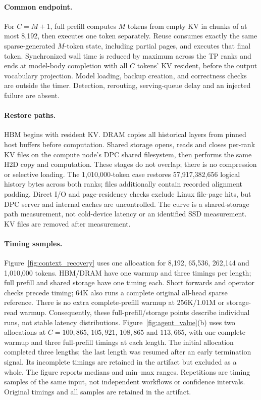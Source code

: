 \documentclass[sigplan,10pt,anonymous,nonacm]{acmart}
\begin{document}
\paragraph{Common endpoint.}
For $C=M+1$, full prefill computes $M$ tokens from empty KV in chunks of
at most 8,192, then executes one token separately. Reuse consumes exactly
the same sparse-generated $M$-token state, including partial pages, and
executes that final token. Synchronized wall time is reduced by maximum
across the TP ranks and ends at model-body completion with all $C$ tokens'
KV resident, before the output vocabulary projection. Model loading,
backup creation, and correctness checks are outside the timer. Detection,
rerouting, serving-queue delay and an injected failure are absent.

\paragraph{Restore paths.}
HBM begins with resident KV. DRAM copies all historical layers from
pinned host buffers before computation. Shared storage opens, reads and
closes per-rank KV files on the compute node's DPC shared filesystem,
then performs the same H2D copy and computation. These stages do not
overlap; there is no compression or selective loading. The 1,010,000-token
case restores 57,917,382,656 logical history bytes across both ranks;
files additionally contain recorded alignment padding. Direct I/O and
page-residency checks exclude Linux file-page hits, but DPC server and
internal caches are uncontrolled. The curve is a shared-storage path
measurement, not cold-device latency or an identified SSD measurement.
KV files are removed after measurement.

\paragraph{Timing samples.}
Figure~\ref{fig:context_recovery} uses one
allocation for 8,192, 65,536, 262,144 and 1,010,000 tokens. HBM/DRAM have
one warmup and three timings per length; full prefill and shared storage
have one timing each. Short forwards and operator checks precede timing;
64K also runs a complete original all-head sparse reference. There is
no extra complete-prefill warmup at 256K/1.01M or storage-read warmup.
Consequently, these full-prefill/storage points describe individual
runs, not stable latency distributions.
Figure~\ref{fig:agent_value}(b) uses two allocations at
$C=100{,}865$, $105{,}921$, $108{,}865$ and $113{,}665$, with one complete
warmup and three full-prefill timings at each length. The initial allocation completed three lengths; the last length was
resumed after an early termination signal. Its incomplete timings are
retained in the artifact but excluded as a whole. The figure reports
medians and min--max ranges. Repetitions are timing samples of the same input,
not independent workflows or confidence intervals. Original timings and
all samples are retained in the artifact.
\end{document}
